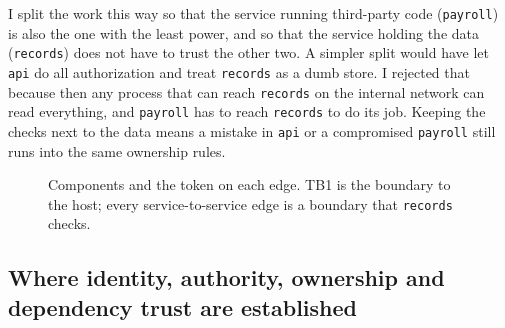 \documentclass[11pt,a4paper]{article}
\begin{document}
I split the work this way so that the service running third-party code (\texttt{payroll}) is also the one with the least power, and so that the service holding the data (\texttt{records}) does not have to trust the other two. A simpler split would have let \texttt{api} do all authorization and treat \texttt{records} as a dumb store. I rejected that because then any process that can reach \texttt{records} on the internal network can read everything, and \texttt{payroll} has to reach \texttt{records} to do its job. Keeping the checks next to the data means a mistake in \texttt{api} or a compromised \texttt{payroll} still runs into the same ownership rules.

\begin{figure}[h]
\centering
{}
\caption{Components and the token on each edge. TB1 is the boundary to the host; every service-to-service edge is a boundary that \texttt{records} checks.}
\label{fig:arch}
\end{figure}

\subsection*{Where identity, authority, ownership and dependency trust are established}
\end{document}
